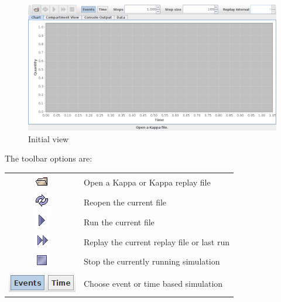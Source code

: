 \begin{figure}[h!]
 \centering
 \includegraphics[scale=0.3]{./images/startup.png}
 \caption{Initial view}
 \label{fig:startup}
\end{figure}

The toolbar options are:

\begin{tabular}{cl}
 \includegraphics[scale=0.5]{./images/Open.png} & Open a Kappa or Kappa replay file \\
 \includegraphics[scale=0.5]{./images/Reopen.png} & Reopen the current file  \\
 \includegraphics[scale=0.5]{./images/Run.png} & Run the current file \\
 \includegraphics[scale=0.5]{./images/Replay.png} & Replay the current replay file or last run \\
 \includegraphics[scale=0.5]{./images/Stop.png} & Stop the currently running simulation \\
 \includegraphics[scale=0.5]{./images/EventsOrTime.png} & Choose event or time based simulation \\
\end{tabular}

